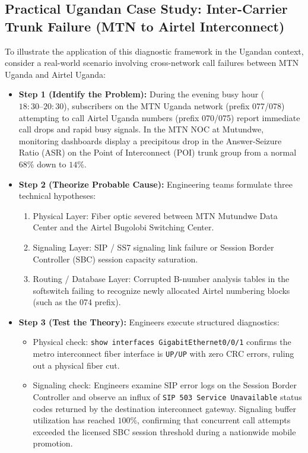 \documentclass[12pt,a4paper]{report}
\begin{document}
\subsection{Practical Ugandan Case Study: Inter-Carrier Trunk Failure (MTN to Airtel Interconnect)}
To illustrate the application of this diagnostic framework in the Ugandan context, consider a real-world scenario involving cross-network call failures between MTN Uganda and Airtel Uganda:
\begin{itemize}
    \item \textbf{Step 1 (Identify the Problem):} During the evening busy hour ($18:30\text{--}20:30$), subscribers on the MTN Uganda network (prefix 077/078) attempting to call Airtel Uganda numbers (prefix 070/075) report immediate call drops and rapid busy signals. In the MTN NOC at Mutundwe, monitoring dashboards display a precipitous drop in the Answer-Seizure Ratio (ASR) on the Point of Interconnect (POI) trunk group from a normal $68\%$ down to $14\%$.
    
    \item \textbf{Step 2 (Theorize Probable Cause):} Engineering teams formulate three technical hypotheses:
    \begin{enumerate}
        \item Physical Layer: Fiber optic severed between MTN Mutundwe Data Center and the Airtel Bugolobi Switching Center.
        \item Signaling Layer: SIP / SS7 signaling link failure or Session Border Controller (SBC) session capacity saturation.
        \item Routing / Database Layer: Corrupted B-number analysis tables in the softswitch failing to recognize newly allocated Airtel numbering blocks (such as the 074 prefix).
    \end{enumerate}
    
    \item \textbf{Step 3 (Test the Theory):} Engineers execute structured diagnostics:
    \begin{itemize}
        \item Physical check: \texttt{show interfaces GigabitEthernet0/0/1} confirms the metro interconnect fiber interface is \texttt{UP/UP} with zero CRC errors, ruling out a physical fiber cut.
        \item Signaling check: Engineers examine SIP error logs on the Session Border Controller and observe an influx of \texttt{SIP 503 Service Unavailable} status codes returned by the destination interconnect gateway. Signaling buffer utilization has reached $100\%$, confirming that concurrent call attempts exceeded the licensed SBC session threshold during a nationwide mobile promotion.
    \end{itemize}
    

\end{itemize}
\end{document}
